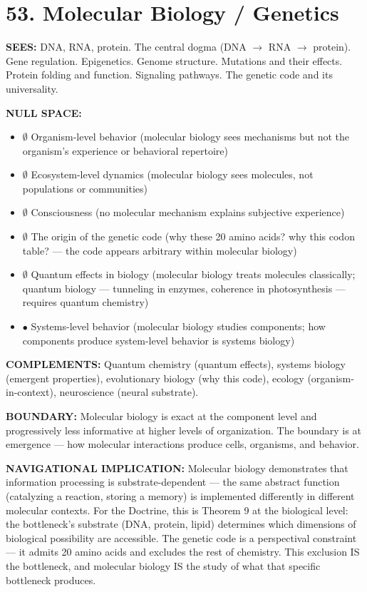 \section*{53. Molecular Biology / Genetics}


\textbf{SEES:} DNA, RNA, protein. The central dogma (DNA $\rightarrow$ RNA $\rightarrow$ protein). Gene regulation. Epigenetics. Genome structure. Mutations and their effects. Protein folding and function. Signaling pathways. The genetic code and its universality.


\textbf{NULL SPACE:}

\begin{itemize}[nosep,leftmargin=*]
  \item $\emptyset$ Organism-level behavior (molecular biology sees mechanisms but not the organism's experience or behavioral repertoire)
  \item $\emptyset$ Ecosystem-level dynamics (molecular biology sees molecules, not populations or communities)
  \item $\emptyset$ Consciousness (no molecular mechanism explains subjective experience)
  \item $\emptyset$ The origin of the genetic code (why these 20 amino acids? why this codon table? — the code appears arbitrary within molecular biology)
  \item $\emptyset$ Quantum effects in biology (molecular biology treats molecules classically; quantum biology — tunneling in enzymes, coherence in photosynthesis — requires quantum chemistry)
  \item $\bullet$ Systems-level behavior (molecular biology studies components; how components produce system-level behavior is systems biology)
\end{itemize}


\textbf{COMPLEMENTS:} Quantum chemistry (quantum effects), systems biology (emergent properties), evolutionary biology (why this code), ecology (organism-in-context), neuroscience (neural substrate).


\textbf{BOUNDARY:} Molecular biology is exact at the component level and progressively less informative at higher levels of organization. The boundary is at emergence — how molecular interactions produce cells, organisms, and behavior.


\textbf{NAVIGATIONAL IMPLICATION:} Molecular biology demonstrates that information processing is substrate-dependent — the same abstract function (catalyzing a reaction, storing a memory) is implemented differently in different molecular contexts. For the Doctrine, this is Theorem 9 at the biological level: the bottleneck's substrate (DNA, protein, lipid) determines which dimensions of biological possibility are accessible. The genetic code is a perspectival constraint — it admits 20 amino acids and excludes the rest of chemistry. This exclusion IS the bottleneck, and molecular biology IS the study of what that specific bottleneck produces.


